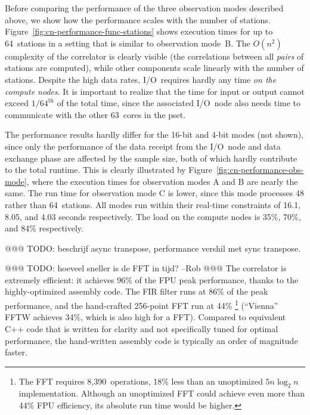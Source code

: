 \documentclass{sig-alternate}
\begin{document}
Before comparing the performance of the three observation modes described
above, we show how the performance scales with the number of stations.
Figure~\ref{fig:cn-performance-func-stations} shows execution times for up to
64~stations in a setting that is similar to observation mode~\textsf{B}.
The $O(n^2)$ complexity of the correlator is clearly visible (the correlations
between all \emph{pairs\/} of stations are computed), while other
components scale linearly with the number of stations.
Despite the high data rates, I/O~requires hardly any time \emph{on the compute nodes}.
It is important to realize that the time for input or output cannot exceed $1/64^\mathrm{th}$
of the total time, since the associated I/O~node also needs time to communicate
with the other 63~cores in the pset.


The performance results hardly differ for the 16-bit and 4-bit modes (not shown),
since only the performance of the data receipt from the I/O~node and data
exchange phase are affected by the sample size, 
both of which hardly contribute to the total runtime.
This is clearly illustrated by Figure~\ref{fig:cn-performance-obs-mode},
where the execution times for observation modes \textsf{A} and \textsf{B}
are nearly the same.
The run time for observation mode \textsf{C} is lower, since this mode
processes 48 rather than 64~stations.
All modes run within their real-time constraints of 16.1, 8.05, and 4.03
seconds respectively.
The load on the compute nodes is 35\%, 70\%, and 84\% respectively.

@@@ TODO: beschrijf async transpose, performance vershil met sync transpose.

@@@ TODO: hoeveel sneller is de FFT in tijd? --Rob @@@
The correlator is extremely efficient: it achieves 96\% of the FPU peak
performance, thanks to the highly-optimized assembly code.
The FIR filter runs at 86\% of the peak performance, and the hand-crafted
256-point FFT run at 44\%%
\footnote{The FFT requires 8,390~operations, 18\% less than an unoptimized
$5n \log_2 n$ implementation.  Although an unoptimized FFT could achieve even
more than 44\% FPU efficiency, its absolute run time would be higher.}
(``Vienna'' FFTW achieves 34\%, which is also high for a FFT).
Compared to equivalent C++ code that is written for clarity and not
specifically tuned for optimal performance, the hand-written assembly code is
typically an order of magnitude faster.
\end{document}
